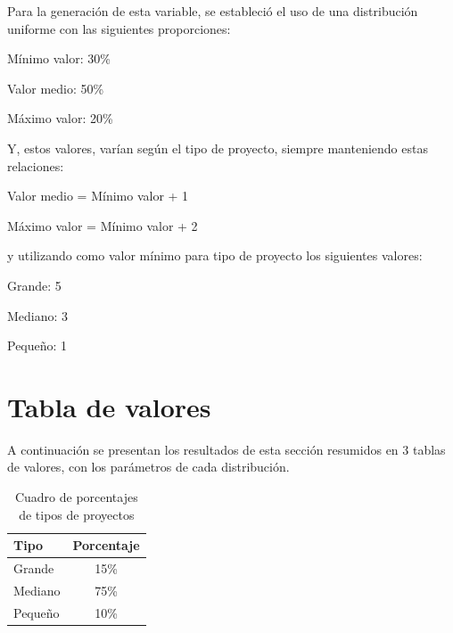 Para la generación de esta variable, se estableció el uso de una distribución uniforme con las siguientes proporciones: 

\begin{itemize*}
    \item Mínimo valor: 30\%
    \item Valor medio: 50\%
    \item Máximo valor: 20\%
\end{itemize*}

Y, estos valores, varían según el tipo de proyecto, siempre manteniendo estas relaciones: 

\begin{itemize*}
    \item Valor medio = Mínimo valor + 1
    \item Máximo valor = Mínimo valor + 2
\end{itemize*}

y utilizando como valor mínimo para tipo de proyecto los siguientes valores: 


\begin{itemize*}
    \item Grande: 5
    \item Mediano: 3
    \item Pequeño: 1
\end{itemize*}


\section*{Tabla de valores}

A continuación se presentan los resultados de esta sección resumidos en 3 tablas de valores, con los parámetros de cada distribución.\\

\begin{table}[H]
\begin{center}
\begin{tabular}{|l|c|}
\hline
    Tipo        & Porcentaje\\
\hline
    Grande      & 15\%\\
\hline
    Mediano     & 75\%\\
\hline
    Pequeño     & 10\%\\
\hline
\end{tabular}

\end{center}

\caption{Cuadro de porcentajes de tipos de proyectos}
\label{tab:tipo-proyecto}

\end{table}

